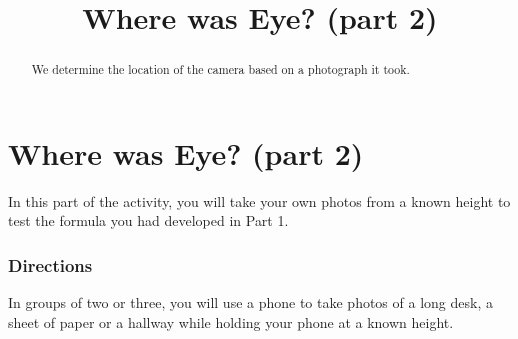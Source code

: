 \documentclass{ximera}
\title{Where was Eye? (part 2)} \license{CC BY-NC-SA 4.0}
\begin{document}
\begin{abstract}
We determine the location of the camera based on a photograph it took.
\end{abstract}
\maketitle

\section*{Where was Eye? (part 2)}


In this part of the activity, you will take your own photos from a known height to test the formula you had developed in Part 1.  

\subsubsection*{Directions}
In groups of two or three, you will use a phone to take photos of a long desk, a sheet of paper or a hallway while holding your phone at a known height.
\end{document}
